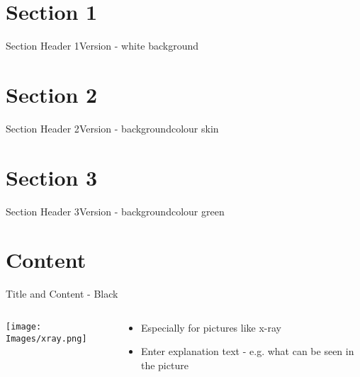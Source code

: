 \documentclass[10pt]{beamer} %
\begin{document}
\section{Section 1}
{\sectionheaderWhite %
\begin{frame}{Section Header 1}{Version - white background}
\end{frame}
}

\section{Section 2}
{\sectionheaderSkin %
\begin{frame}{Section Header 2}{Version - backgroundcolour skin}
\end{frame}
}

\section{Section 3}
{\sectionheaderGreen %
\begin{frame}{Section Header 3}{Version - backgroundcolour green}
\end{frame}
}

\section{Content}
{\blackSlide %
\begin{frame}{Title and Content - Black}
\begin{columns}
  \begin{column}{0.3\textwidth}
    \begin{center}
     \texttt{[image: Images/xray.png]}
     \end{center}
  \end{column}
  \begin{column}{0.7\textwidth}  %
    \begin{itemize}
	  \item Especially for pictures like x-ray
	  \item Enter explanation text - e.g. what can be seen in the picture
	\end{itemize}
  \end{column}
\end{columns}

\end{frame}
}
\end{document}
